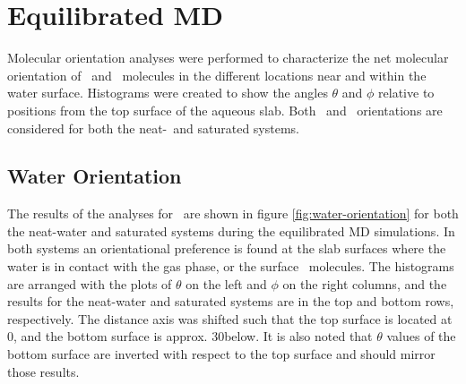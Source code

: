 \section{Equilibrated MD}

Molecular orientation analyses were performed to characterize the net molecular orientation of \wat~and \suldiox~molecules in the different locations near and within the water surface. Histograms were created to show the angles $\theta$ and $\phi$ relative to positions from the top surface of the aqueous slab. Both \wat~and \suldiox~orientations are considered for both the neat-\wat~and saturated systems.

\subsection{Water Orientation}

The results of the analyses for \wat~are shown in figure \ref{fig:water-orientation} for both the neat-water and saturated systems during the equilibrated MD simulations. In both systems an orientational preference is found at the slab surfaces where the water is in contact with the gas phase, or the surface \suldiox~molecules. The histograms are arranged with the plots of $\theta$ on the left and $\phi$ on the right columns, and the results for the neat-water and saturated systems are in the top and bottom rows, respectively. The distance axis was shifted such that the top surface is located at 0\angs, and the bottom surface is approx. 30\angs below. It is also noted that $\theta$ values of the bottom surface are inverted with respect to the top surface and should mirror those results. %

